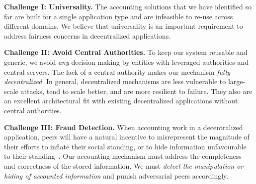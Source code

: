 \textbf{Challenge I: Universality.}
The accounting solutions that we have identified so far are built for a single application type and are infeasible to re-use across different domains.
We believe that universality is an important requirement to address fairness concerns in decentralized applications.

\textbf{Challenge II: Avoid Central Authorities.}
To keep our system reusable and generic, we avoid \emph{any} decision making by entities with leveraged authorities and central servers.
The lack of a central authority makes our mechanism \emph{fully decentralized}.
In general, decentralized mechanisms are less vulnerable to large-scale attacks, tend to scale better, and are more resilient to failure.
They also are an excellent architectural fit with existing decentralized applications without central authorities.

\textbf{Challenge III: Fraud Detection.}
When accounting work in a decentralized application, peers will have a natural incentive to misrepresent the magnitude of their efforts to inflate their social standing, or to hide information unfavourable to their standing~\cite{meulpolder2009bartercast}.
Our accounting mechanism must address the completeness and correctness of the stored information.
We must \emph{detect the manipulation or hiding of accounted information} and punish adversarial peers accordingly.





